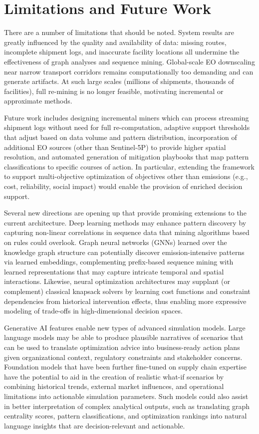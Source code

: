\documentclass[conference]{IEEEtran}
\begin{document}
\section{Limitations and Future Work}
There are a number of limitations that should be noted. System results are greatly influenced by the quality and availability of data: missing routes, incomplete shipment logs, and inaccurate facility locations all undermine the effectiveness of graph analyses and sequence mining. Global-scale EO downscaling near narrow transport corridors remains computationally too demanding and can generate artifacts. At such large scales (millions of shipments, thousands of facilities), full re-mining is no longer feasible, motivating incremental or approximate methods.

Future work includes designing incremental miners which can process streaming shipment logs without need for full re-computation, adaptive support thresholds that adjust based on data volume and pattern distribution, incorporation of additional EO sources (other than Sentinel-5P) to provide higher spatial resolution, and automated generation of mitigation playbooks that map pattern classifications to specific courses of action. In particular, extending the framework to support multi-objective optimization of objectives other than emissions (e.g., cost, reliability, social impact) would enable the provision of enriched decision support.

Several new directions are opening up that provide promising extensions to the current architecture. Deep learning methods may enhance pattern discovery by capturing non-linear correlations in sequence data that mining algorithms based on rules could overlook. Graph neural networks (GNNs) learned over the knowledge graph structure can potentially discover emission-intensive patterns via learned embeddings, complementing prefix-based sequence mining with learned representations that may capture intricate temporal and spatial interactions. Likewise, neural optimization architectures may supplant (or complement) classical knapsack solvers by learning cost functions and constraint dependencies from historical intervention effects, thus enabling more expressive modeling of trade-offs in high-dimensional decision spaces.

Generative AI features enable new types of advanced simulation models. Large language models may be able to produce plausible narratives of scenarios that can be used to translate optimization advice into business-ready action plans given organizational context, regulatory constraints and stakeholder concerns. Foundation models that have been further fine-tuned on supply chain expertise have the potential to aid in the creation of realistic what-if scenarios by combining historical trends, external market influences, and operational limitations into actionable simulation parameters. Such models could also assist in better interpretation of complex analytical outputs, such as translating graph centrality scores, pattern classifications, and optimization rankings into natural language insights that are decision-relevant and actionable.
\end{document}

